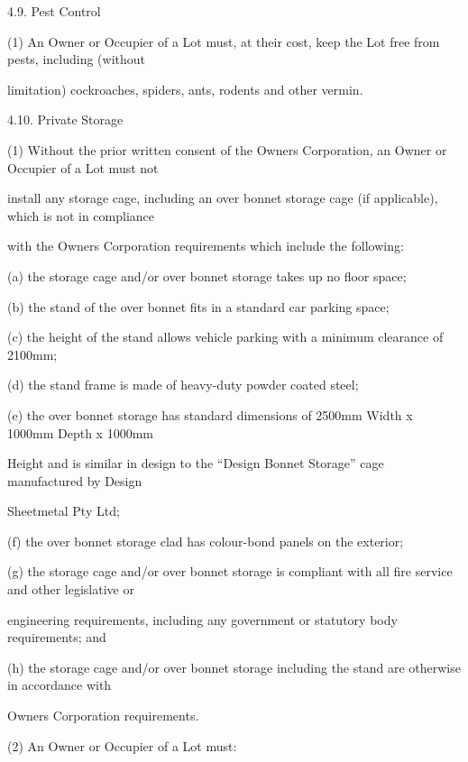 \documentclass{article}
\begin{document}
{\fontsize{9.99}{1}4.9. Pest Control }

{\fontsize{9.962}{1}(1) An Owner or Occupier of a Lot must, at their cost, keep the Lot free from pests, including (without }

{\fontsize{10.02}{1}limitation) cockroaches, spiders, ants, rodents and other vermin. }

{\fontsize{9.99}{1}4.10. Private Storage }

{\fontsize{9.962}{1}(1) Without the prior written consent of the Owners Corporation, an Owner or Occupier of a Lot must not }

{\fontsize{10.02}{1}install any storage cage, including an over bonnet storage cage (if applicable), which is not in compliance }

{\fontsize{10.02}{1}with the Owners Corporation requirements which include the following: }

{\fontsize{9.962}{1}(a) the storage cage and/or over bonnet storage takes up no floor space; }

{\fontsize{9.962}{1}(b) the stand of the over bonnet fits in a standard car parking space; }

{\fontsize{9.962}{1}(c) the height of the stand allows vehicle parking with a minimum clearance of 2100mm; }

{\fontsize{9.962}{1}(d) the stand frame is made of heavy-duty powder coated steel; }

{\fontsize{9.962}{1}(e) the over bonnet storage has standard dimensions of 2500mm Width x 1000mm Depth x 1000mm }

{\fontsize{10.02}{1}Height and is similar in design to the “Design Bonnet Storage” cage manufactured by Design }

{\fontsize{10.02}{1}Sheetmetal Pty Ltd; }

{\fontsize{9.962}{1}(f) the over bonnet storage clad has colour-bond panels on the exterior; }


{\fontsize{9.962}{1}(g) the storage cage and/or over bonnet storage is compliant with all fire service and other legislative or }

{\fontsize{10.02}{1}engineering requirements, including any government or statutory body requirements; and }

{\fontsize{9.962}{1}(h) the storage cage and/or over bonnet storage including the stand are otherwise in accordance with }

{\fontsize{10.02}{1}Owners Corporation requirements. }

{\fontsize{9.962}{1}(2) An Owner or Occupier of a Lot must: }
\end{document}
